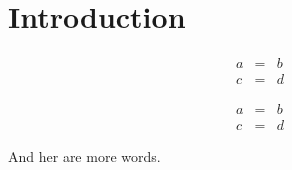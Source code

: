 \section{Introduction} 
\begin{eqnarray}
a & = & b\\
c & = & d
\end{eqnarray}

\begin{eqnarray}
a & = & b \label{a}\\
c & = & d
\end{eqnarray}

And her are more words.
